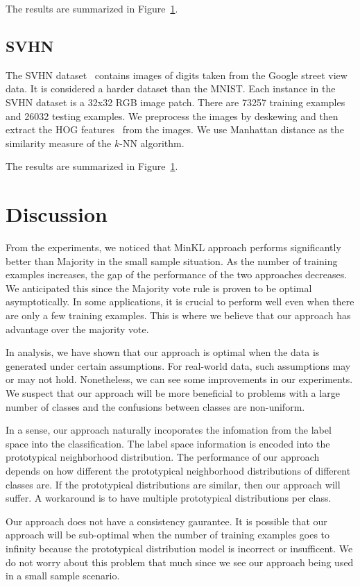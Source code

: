 \documentclass{article}
\begin{document}
The results are summarized in Figure~\ref{}. 

\subsection{SVHN}
The SVHN dataset~\cite{} contains images of digits taken from the Google
street view data. It is considered a harder dataset than the
MNIST. Each instance in the SVHN dataset is a 32x32 RGB image
patch. There are 73257 training examples and 26032 testing
examples. We preprocess the images by deskewing and then extract the
HOG features~\cite{} from the images. We use Manhattan distance as the
similarity measure of the $k$-NN algorithm.

The results are summarized in Figure~\ref{}.



\section{Discussion}

From the experiments, we noticed that MinKL approach performs
significantly better than Majority in the small sample situation. As
the number of training examples increases, the gap of the performance
of the two approaches decreases. We anticipated this since the
Majority vote rule is proven to be optimal asymptotically. In some
applications, it is crucial to perform well even when there are only a
few training examples. This is where we believe that our approach has
advantage over the majority vote.

In analysis, we have shown that our approach is optimal when the data
is generated under certain assumptions. For real-world data,
such assumptions may or may not hold. Nonetheless, we can see some
improvements in our experiments. We suspect that our approach will be
more beneficial to problems with a large number of classes and the
confusions between classes are non-uniform. 

In a sense, our approach naturally incoporates the infomation from the
label space into the classification. The label space information is
encoded into the prototypical neighborhood distribution. The
performance of our approach depends on how
different the prototypical neighborhood distributions of different
classes are. If the prototypical distributions are similar, then our
approach will suffer. A workaround is to have multiple prototypical
distributions per class. 

Our approach does not have a consistency gaurantee. It is
possible that our approach will be sub-optimal when the number of
training examples goes to infinity because the prototypical
distribution model is incorrect or insufficent. We do not worry
about this problem that much since we see our approach being used
in a small sample scenario.
\end{document}
